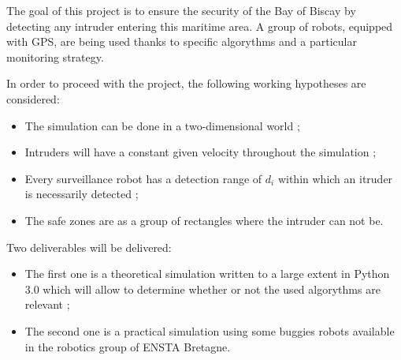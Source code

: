 \bigskip

The goal of this project is to ensure the security of the Bay of Biscay by detecting any intruder entering this maritime area.
A group of robots, equipped with GPS, are being used thanks to specific algorythms and a particular monitoring strategy.

\bigskip

In order to proceed with the project, the following working hypotheses are considered:
\begin{itemize}
\item The simulation can be done in a two-dimensional world ;
\item Intruders will have a constant given velocity throughout the simulation ;
\item Every surveillance robot has a detection range of $d_{i}$ within which an itruder is necessarily detected ;
\item The safe zones are as a group of rectangles where the intruder can not be.
\end{itemize}

\bigskip

Two deliverables will be delivered:
\begin{itemize}
\item The first one is a theoretical simulation written to a large extent in Python 3.0 which will allow to determine whether or not the used algorythms are relevant ;
\item The second one is a practical simulation using some buggies robots available in the robotics group of ENSTA Bretagne.
\end{itemize}

